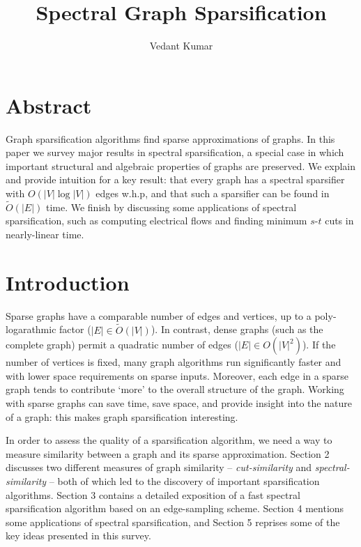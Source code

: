 \documentclass{article}
\title{Spectral Graph Sparsification}
\author{Vedant Kumar}
\begin{document}
\maketitle

\newcommand \textlcsc[1]{\textsc{\MakeLowercase{#1}}}

\section*{Abstract}

Graph sparsification algorithms find sparse approximations of graphs. In
this paper we survey major results in spectral sparsification, a special
case in which important structural and algebraic properties of graphs are
preserved. We explain and provide intuition for a key result: that every
graph has a spectral sparsifier with $O(|V|\log|V|)$ edges w.h.p, and that
such a sparsifier can be found in $\tilde{O}(|E|)$ time. We finish by
discussing some applications of spectral sparsification, such as computing
electrical flows and finding minimum $s$-$t$ cuts in nearly-linear time.

\section{Introduction}

Sparse graphs have a comparable number of edges and vertices, up to a
poly-logarathmic factor ($|E| \in \tilde{O}(|V|)$). In contrast, dense
graphs (such as the complete graph) permit a quadratic number of edges ($|E|
\in O(|V|^2)$). If the number of vertices is fixed, many graph algorithms
run significantly faster and with lower space requirements on sparse inputs.
Moreover, each edge in a sparse graph tends to contribute `more' to the
overall structure of the graph.  Working with sparse graphs can save time,
save space, and provide insight into the nature of a graph: this makes graph
sparsification interesting.

In order to assess the quality of a sparsification algorithm, we need a way
to measure similarity between a graph and its sparse approximation. Section
2 discusses two different measures of graph similarity --
\textit{cut-similarity} and \textit{spectral-similarity} -- both of which
led to the discovery of important sparsification algorithms. Section 3
contains a detailed exposition of a fast spectral sparsification algorithm
based on an edge-sampling scheme.  Section 4 mentions some applications of
spectral sparsification, and Section 5 reprises some of the key ideas
presented in this survey.
\end{document}
